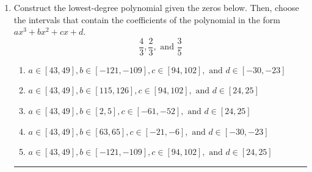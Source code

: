 \documentclass[14pt]{extbook}
\newcommand{\litem}[1]{\item#1\hspace*{-1cm}\rule{\textwidth}{0.4pt}}
\begin{document}
\begin{enumerate}
\litem{
Construct the lowest-degree polynomial given the zeros below. Then, choose the intervals that contain the coefficients of the polynomial in the form $ax^3+bx^2+cx+d$.\[ \frac{4}{3}, \frac{2}{3}, \text{ and } \frac{3}{5} \]\begin{enumerate}[label=\Alph*.]
\item \( a \in [43, 49], b \in [-121, -109], c \in [94, 102], \text{ and } d \in [-30, -23] \)
\item \( a \in [43, 49], b \in [115, 126], c \in [94, 102], \text{ and } d \in [24, 25] \)
\item \( a \in [43, 49], b \in [2, 5], c \in [-61, -52], \text{ and } d \in [24, 25] \)
\item \( a \in [43, 49], b \in [63, 65], c \in [-21, -6], \text{ and } d \in [-30, -23] \)
\item \( a \in [43, 49], b \in [-121, -109], c \in [94, 102], \text{ and } d \in [24, 25] \)


\end{enumerate}}
\end{enumerate}
\end{document}
